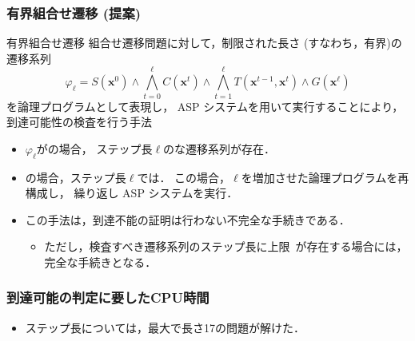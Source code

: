 \begin{frame}%
  \frametitle{有界組合せ遷移 (提案)} 
  \begin{alertblock}{有界組合せ遷移}\centering
    組合せ遷移問題に対して，制限された長さ (すなわち，有界)の
    遷移系列
    \[
    \varphi_{\ell} = S(\bm{x}^0)  
    \land \bigwedge_{t=0}^{\ell} C(\bm{x}^t) 
    \land \bigwedge_{t=1}^{\ell} T(\bm{x}^{t-1},\bm{x}^{t}) 
    \land G(\bm{x}^\ell)  
    \]
    を論理プログラムとして表現し，
    ASP システムを用いて実行することにより，到達可能性の検査を行う手法
  \end{alertblock}
  \begin{itemize}
  \item $\varphi_{\ell}$がの場合，
    ステップ長$\ell$のな遷移系列が存在．
  \item {}の場合，ステップ長$\ell$では．
    この場合，$\ell$を増加させた論理プログラムを再構成し，
    繰り返し ASP システムを実行．
  \item この手法は，到達不能の証明は行わない不完全な手続きである．
    \begin{itemize}
      \item ただし，検査すべき遷移系列のステップ長に上限~\footnotemark[2]
        が存在する場合には，完全な手続きとなる．
    \end{itemize}
  \end{itemize}
\end{frame}
\begin{frame}
  \frametitle{到達可能の判定に要したCPU時間}

  \begin{exampleblock}{}
    \centering
    \scalebox{0.75}{}
  \end{exampleblock}
  \begin{itemize}
    \item ステップ長については，最大で長さ17の問題が解けた．
  \end{itemize}
\end{frame}
